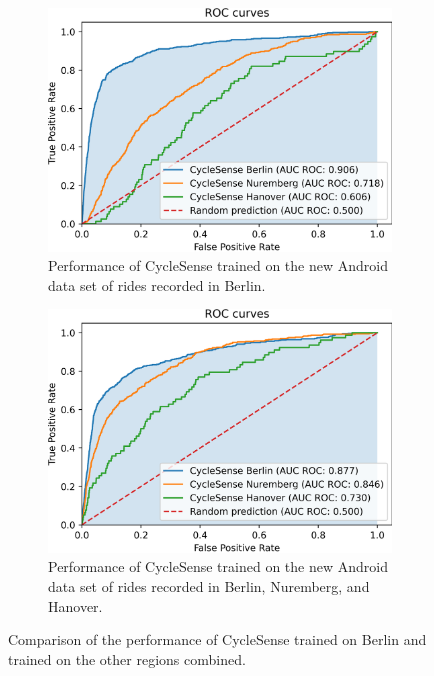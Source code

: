 \begin{figure}[t]
	\centering
	\begin{subfigure}[b]{0.475\textwidth}
		\centering
		\includegraphics[width=\textwidth]{fig/city_comp_before.png}
		\caption{\small Performance of CycleSense trained on the new Android data set of rides recorded in Berlin. \newline}
		\label{fig:different-city-trained-on-berlin}
	\end{subfigure}
	\hfill
	\begin{subfigure}[b]{0.475\textwidth}
		\centering
		\includegraphics[width=\textwidth]{fig/city_comp_after.png}
		\caption{\small Performance of CycleSense trained on the new Android data set of rides recorded in Berlin, Nuremberg, and Hanover.}
		\label{fig:different-city-trained-individually}
	\end{subfigure}
	\caption{Comparison of the performance of CycleSense trained on Berlin and trained on the other regions combined.}
\end{figure}


